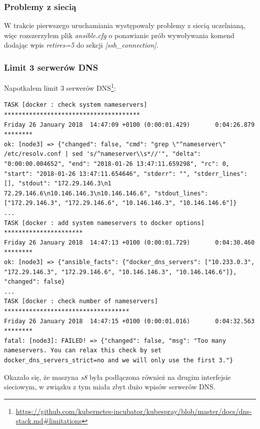 \documentclass[a4paper,12pt,twoside,openany]{report}
\DeclareRobustCommand{\href}[2]{#2\footnote{\url{#1}}}
\begin{document}
\hypertarget{problemy-z-sieciux105}{%
\subsubsection{Problemy z siecią}\label{problemy-z-sieciux105}}

W trakcie pierwszego uruchamiania występowały problemy z siecią
uczelnianą, więc rozszerzyłem plik \emph{ansible.cfg} o ponawianie prób
wywoływania komend dodając wpis \emph{retires=5} do sekcji
\emph{{[}ssh\_connection{]}}.

\hypertarget{limit-3-serweruxf3w-dns}{%
\subsubsection{Limit 3 serwerów DNS}\label{limit-3-serweruxf3w-dns}}

Napotkałem
\href{https://github.com/kubernetes-incubator/kubespray/blob/master/docs/dns-stack.md\#limitations}{limit
3 serwerów DNS}:

\begin{lstlisting}
TASK [docker : check system nameservers] **************************************
Friday 26 January 2018  14:47:09 +0100 (0:00:01.429)       0:04:26.879 ******** 
ok: [node3] => {"changed": false, "cmd": "grep \"^nameserver\" /etc/resolv.conf | sed 's/^nameserver\\s*//'", "delta": "0:00:00.004652", "end": "2018-01-26 13:47:11.659298", "rc": 0, "start": "2018-01-26 13:47:11.654646", "stderr": "", "stderr_lines": [], "stdout": "172.29.146.3\n1
72.29.146.6\n10.146.146.3\n10.146.146.6", "stdout_lines": ["172.29.146.3", "172.29.146.6", "10.146.146.3", "10.146.146.6"]}
...
TASK [docker : add system nameservers to docker options] **********************
Friday 26 January 2018  14:47:13 +0100 (0:00:01.729)       0:04:30.460 ******** 
ok: [node3] => {"ansible_facts": {"docker_dns_servers": ["10.233.0.3", "172.29.146.3", "172.29.146.6", "10.146.146.3", "10.146.146.6"]}, "changed": false}
...
TASK [docker : check number of nameservers] ***********************************
Friday 26 January 2018  14:47:15 +0100 (0:00:01.016)       0:04:32.563 ******** 
fatal: [node3]: FAILED! => {"changed": false, "msg": "Too many nameservers. You can relax this check by set docker_dns_servers_strict=no and we will only use the first 3."}
\end{lstlisting}

Okazało się, że maszyna \emph{s8} była podłączona również na drugim
interfejsie sieciowym, w związku z tym miała zbyt dużo wpisów serwerów
DNS.
\end{document}
